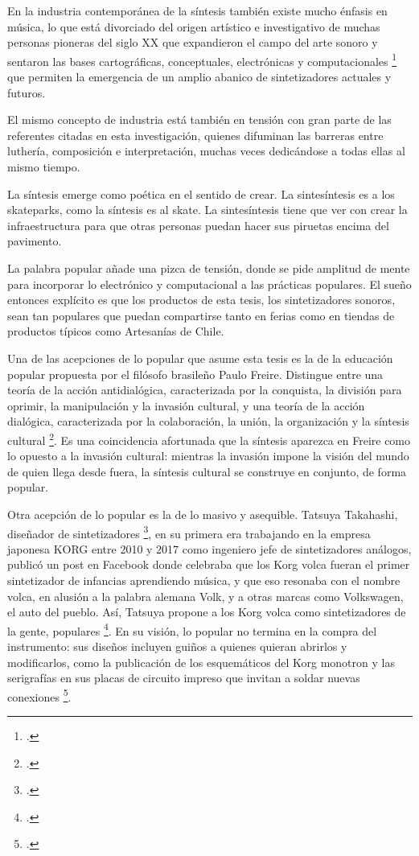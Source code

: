 \documentclass[../candidatura.tex]{subfiles}
\begin{document}
En la industria contemporánea de la síntesis también existe mucho énfasis en música, lo que está divorciado del origen artístico e investigativo de muchas personas pioneras del siglo XX que expandieron el campo del arte sonoro y sentaron las bases cartográficas, conceptuales, electrónicas y computacionales \footcite{roads_computer_1996} que permiten la emergencia de un amplio abanico de sintetizadores actuales y futuros.

El mismo concepto de industria está también en tensión con gran parte de las referentes citadas en esta investigación, quienes difuminan las barreras entre luthería, composición e interpretación, muchas veces dedicándose a todas ellas al mismo tiempo.

La síntesis emerge como poética en el sentido de crear. La sintesíntesis es a los skateparks, como la síntesis es al skate. La sintesíntesis tiene que ver con crear la infraestructura para que otras personas puedan hacer sus piruetas encima del pavimento.

La palabra popular añade una pizca de tensión, donde se pide amplitud de mente para incorporar lo electrónico y computacional a las prácticas populares. El sueño entonces explícito es que los productos de esta tesis, los sintetizadores sonoros, sean tan populares que puedan compartirse tanto en ferias como en tiendas de productos típicos como Artesanías de Chile.

Una de las acepciones de lo popular que asume esta tesis es la de la educación popular propuesta por el filósofo brasileño Paulo Freire. Distingue entre una teoría de la acción antidialógica, caracterizada por la conquista, la división para oprimir, la manipulación y la invasión cultural, y una teoría de la acción dialógica, caracterizada por la colaboración, la unión, la organización y la síntesis cultural \footcite{freire_pedagogia_1970}. Es una coincidencia afortunada que la síntesis aparezca en Freire como lo opuesto a la invasión cultural: mientras la invasión impone la visión del mundo de quien llega desde fuera, la síntesis cultural se construye en conjunto, de forma popular.

Otra acepción de lo popular es la de lo masivo y asequible. Tatsuya Takahashi, diseñador de sintetizadores \footcite{james_takahashi_2017}, en su primera era trabajando en la empresa japonesa KORG entre 2010 y 2017 como ingeniero jefe de sintetizadores análogos, publicó un post en Facebook donde celebraba que los Korg volca fueran el primer sintetizador de infancias aprendiendo música, y que eso resonaba con el nombre volca, en alusión a la palabra alemana Volk, y a otras marcas como Volkswagen, el auto del pueblo. Así, Tatsuya propone a los Korg volca como sintetizadores de la gente, populares \footcite{synthtopia_takahashi_2017}. En su visión, lo popular no termina en la compra del instrumento: sus diseños incluyen guiños a quienes quieran abrirlos y modificarlos, como la publicación de los esquemáticos del Korg monotron y las serigrafías en sus placas de circuito impreso que invitan a soldar nuevas conexiones \footcite{korg_monotron_sinfecha}.
\end{document}

